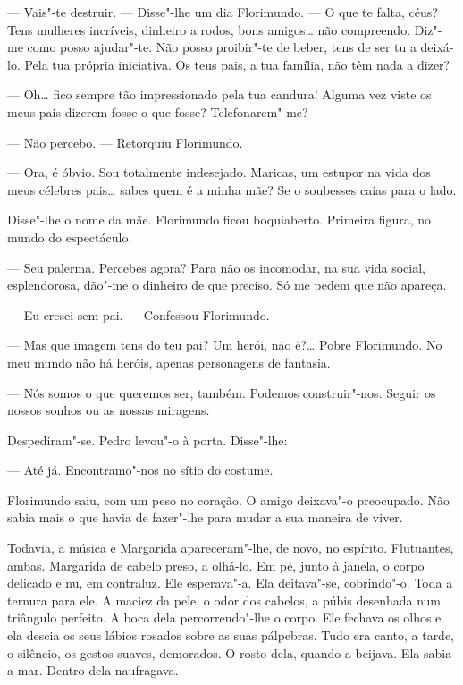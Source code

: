 --- Vais"-te destruir. --- Disse"-lhe um dia Florimundo. --- O que te falta,
céus? Tens mulheres incríveis, dinheiro a rodos, bons amigos\ldots{} não
compreendo. Diz"-me como posso ajudar"-te. Não posso proibir"-te de beber,
tens de ser tu a deixá-lo. Pela tua própria iniciativa. Os teus pais, a
tua família, não têm nada a dizer?

--- Oh\ldots{} fico sempre tão impressionado pela tua candura! Alguma vez viste
os meus pais dizerem fosse o que fosse? Telefonarem"-me?

--- Não percebo. --- Retorquiu Florimundo.

--- Ora, é óbvio. Sou totalmente indesejado. Maricas, um estupor na vida
dos meus célebres pais\ldots{} sabes quem é a minha mãe? Se o soubesses caías
para o lado.

Disse"-lhe o nome da mãe. Florimundo ficou boquiaberto. Primeira figura,
no mundo do espectáculo.

--- Seu palerma. Percebes agora? Para não os incomodar, na sua vida
social, esplendorosa, dão"-me o dinheiro de que preciso. Só me pedem que
não apareça.

--- Eu cresci sem pai. --- Confessou Florimundo.

--- Mas que imagem tens do teu pai? Um herói, não é?\ldots{} Pobre Florimundo.
No meu mundo não há heróis, apenas personagens de fantasia.

--- Nós somos o que queremos ser, também. Podemos construir"-nos. Seguir os
nossos sonhos ou as nossas miragens.

Despediram"-se. Pedro levou"-o à porta. Disse"-lhe:

--- Até já. Encontramo"-nos no sítio do costume.

Florimundo saiu, com um peso no coração. O amigo deixava"-o preocupado.
Não sabia mais o que havia de fazer"-lhe para mudar a sua maneira de
viver.

Todavia, a música e Margarida apareceram"-lhe, de novo, no espírito.
Flutuantes, ambas. Margarida de cabelo preso, a olhá-lo. Em pé, junto à
janela, o corpo delicado e nu, em contraluz. Ele esperava"-a. Ela
deitava"-se, cobrindo"-o. Toda a ternura para ele. A maciez da pele, o
odor dos cabelos, a púbis desenhada num triângulo perfeito. A boca dela
percorrendo"-lhe o corpo. Ele fechava os olhos e ela descia os seus
lábios rosados sobre as suas pálpebras. Tudo era canto, a tarde, o
silêncio, os gestos suaves, demorados. O rosto dela, quando a beijava.
Ela sabia a mar. Dentro dela naufragava.

